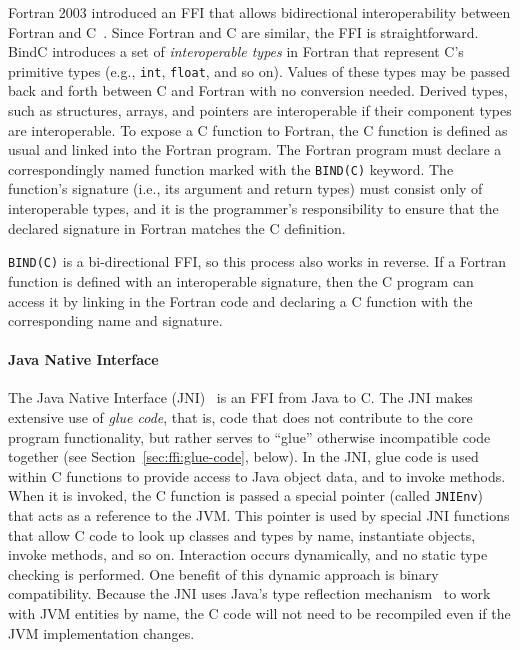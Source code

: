 Fortran 2003 introduced an FFI that allows bidirectional
interoperability between Fortran and C~\cite{reid07fortran,
reid00fortran}. Since Fortran and C are similar, the FFI is
straightforward. BindC introduces a set of \emph{interoperable
types} in Fortran that represent C's primitive types (e.g.,
\texttt{int}, \texttt{float}, and so on). Values of these types
may be passed back and forth between C and Fortran with no
conversion needed. Derived types, such as structures, arrays, and
pointers are interoperable if their component types are
interoperable. To expose a C function to Fortran, the C function
is defined as usual and linked into the Fortran program. The
Fortran program must declare a correspondingly named function
marked with the \texttt{BIND(C)} keyword. The function's signature
(i.e., its argument and return types) must consist only of
interoperable types, and it is the programmer's responsibility to
ensure that the declared signature in Fortran matches the C
definition.

\texttt{BIND(C)} is a bi-directional FFI, so this process also
works in reverse. If a Fortran function is defined with an
interoperable signature, then the C program can access it by
linking in the Fortran code and declaring a C function with the
corresponding name and signature.

\paragraph{Java Native Interface}
\label{jni}

The Java Native Interface (JNI)~\cite{liang99jni} is an FFI from
Java to C. The JNI makes extensive use of \emph{glue code}, that
is, code that does not contribute to the core program
functionality, but rather serves to ``glue'' otherwise
incompatible code together (see Section~\ref{sec:ffi:glue-code},
below). In the JNI, glue code is used within C functions to
provide access to Java object data, and to invoke methods. When it
is invoked, the C function is passed a special pointer (called
\texttt{JNIEnv}) that acts as a reference to the JVM. This pointer
is used by special JNI functions that allow C code to look up
classes and types by name, instantiate objects, invoke methods,
and so on. Interaction occurs dynamically, and no static type
checking is performed. One benefit of this dynamic approach is
binary compatibility. Because the JNI uses Java's type reflection
mechanism~\cite{gosling00java} to work with JVM entities by name,
the C code will not need to be recompiled even if the JVM
implementation changes.

